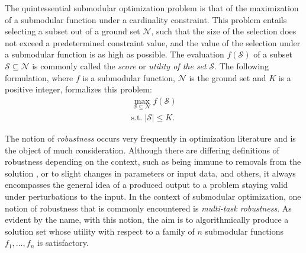 \documentclass[letter,11pt]{article}
\def\sS{\mathcal{S}}
\def\sN{\mathcal{N}}
\begin{document}
The quintessential submodular optimization problem is that of the maximization of a submodular function under a cardinality constraint. This problem entails selecting a subset out of a ground set $\mathcal{N}$, such that the size of the selection does not exceed a predetermined constraint value, and the value of the selection under a submodular function is as high as possible. The evaluation $f(\mathcal{S})$ of a subset $\mathcal{S} \subseteq \mathcal{N}$ is commonly called the \textit{score} or \textit{utility of the set} $\sS$. The following formulation, where $f$ is a submodular function, $\sN$ is the ground set and $K$ is a positive integer, formalizes this problem\cite{cardinality}:
\begin{equation}
\begin{gathered}
\max_{\sS\subseteq \sN}f(\sS) \label{cardinality}\\
\text{s.t.}\;\lvert \sS\rvert \leq K.
\end{gathered}
\end{equation}

The notion of \textit{robustness} occurs very frequently in optimization literature and is the object of much consideration. Although there are differing definitions of robustness depending on the context, such as being immune to removals from the solution \cite{partitioning}, or to slight changes in parameters or input data\cite{Lan2020}, and others\cite{robust-survey}, it always encompasses the general idea of a produced output to a problem staying valid under perturbations to the input. In the context of submodular optimization, one notion of robustness that is commonly encountered is \textit{multi-task robustness}. As evident by the name, with this notion, the aim is to algorithmically produce a solution set whose utility with respect to a family of $n$ submodular functions $f_1, \ldots, f_n$ is satisfactory.
\end{document}
